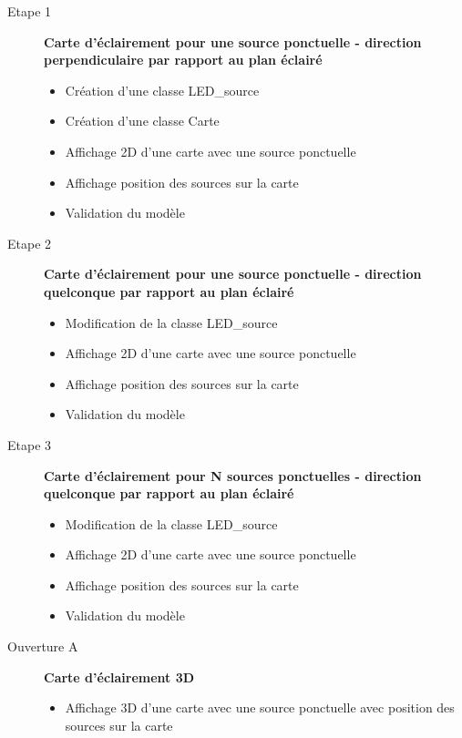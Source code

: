 \documentclass[10pt]{article} %
\begin{document}
\begin{description}
	\item[Etape 1] \textbf{Carte d'éclairement pour une source ponctuelle - direction perpendiculaire par rapport au plan éclairé}
	
	\begin{itemize}
		\item Création d'une classe LED\_source
		\item Création d'une classe Carte
		\item Affichage 2D d'une carte avec une source ponctuelle
		\item Affichage position des sources sur la carte
		\item Validation du modèle
	\end{itemize}
	

\qquad
	
	\item[Etape 2] \textbf{Carte d'éclairement pour une source ponctuelle - direction quelconque par rapport au plan éclairé}
	
	\begin{itemize}
		\item Modification de la classe LED\_source
		\item Affichage 2D d'une carte avec une source ponctuelle
		\item Affichage position des sources sur la carte
		\item Validation du modèle
	\end{itemize}
	
\qquad

	\item[Etape 3] \textbf{Carte d'éclairement pour N sources ponctuelles - direction quelconque par rapport au plan éclairé}
	
	\begin{itemize}
		\item Modification de la classe LED\_source
		\item Affichage 2D d'une carte avec une source ponctuelle
		\item Affichage position des sources sur la carte
		\item Validation du modèle
	\end{itemize}

\qquad

	\item[Ouverture A] \textbf{Carte d'éclairement 3D}
	
	\begin{itemize}
		\item Affichage 3D d'une carte avec une source ponctuelle avec position des sources sur la carte
	\end{itemize}	


\end{description}
\end{document}
